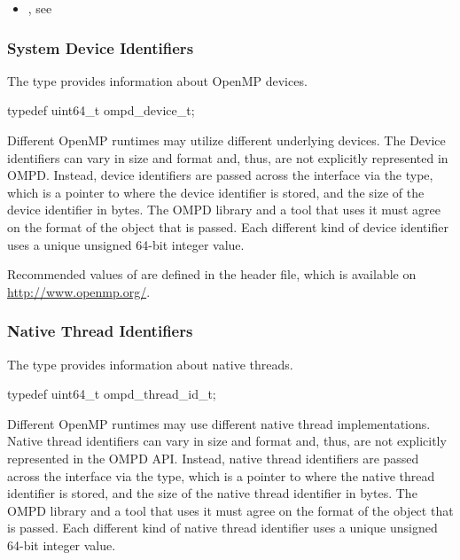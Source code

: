 \crossreferences
\begin{itemize}
\item {}, 
see 
\end{itemize}

\subsubsection{System Device Identifiers}
\label{ompd:omp_device_t}

\summary
The  type provides information about OpenMP devices.

\format
\begin{ccppspecific}
\begin{ompSyntax}
typedef uint64_t ompd_device_t;
\end{ompSyntax}
\end{ccppspecific}
\descr
Different OpenMP runtimes may utilize different underlying devices. The 
Device identifiers can vary in size and format and, thus, are not explicitly 
represented in OMPD. Instead, device identifiers are passed across the interface 
via the  type, which is a pointer to where the device 
identifier is stored, and the size of the device identifier in bytes. The 
OMPD library and a tool that uses it must agree on the format of the object 
that is passed. Each different kind of device identifier uses a unique 
unsigned 64-bit integer value.

Recommended values of  are defined in the 
header file, which is available on \url{http://www.openmp.org/}.



\subsubsection{Native Thread Identifiers}
\label{ompd:ompd_thread_id_t}

\summary
The  type provides information about native threads.

\format
\begin{ccppspecific}
\begin{ompSyntax}
typedef uint64_t ompd_thread_id_t;
\end{ompSyntax}
\end{ccppspecific}

\descr
Different OpenMP runtimes may use different native thread implementations.
Native thread identifiers can vary in size and format and, thus, are not 
explicitly represented in the OMPD API. Instead, native thread identifiers 
are passed across the interface via the  type, which 
is a pointer to where the native thread identifier is stored, and the size 
of the native thread identifier in bytes. The OMPD library and a tool that 
uses it must agree on the format of the object that is passed. Each different 
kind of native thread identifier uses a unique unsigned 64-bit integer value.

